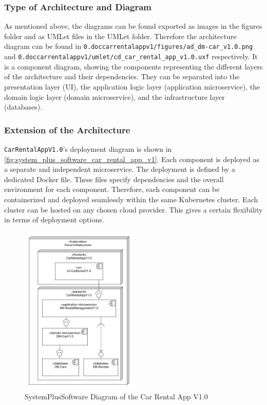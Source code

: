 \subsubsection*{Type of Architecture and Diagram}
As mentioned above, the diagrams can be found exported as images in the figures folder and as UMLet files in the UMLet folder.
Therefore the architecture diagram can be found in \texttt{0.doccarrentalappv1/figures/ad\_dm-car\_v1.0.png} and \hfill \linebreak \texttt{0.doccarrentalappv1/umlet/cd\_car\_rental\_app\_v1.0.uxf} respectively.
It is a component diagram, showing the components representing the different layers of the architecture and their dependencies.
They can be separated into the presentation layer (UI), the application logic layer (application microservice), the domain logic layer (domain microservice), and the infrastructure layer (databases).

\subsubsection*{Extension of the Architecture}
\texttt{CarRentalAppV1.0}'s deployment diagram is shown in \autoref{fig:system_plus_software_car_rental_app_v1}.
Each component is deployed as a separate and independent microservice.
The deployment is defined by a dedicated Docker file.
These files specify dependencies and the overall environment for each component.
Therefore, each component can be containerized and deployed seamlessly within the same Kubernetes cluster.
Each cluster can be hosted on any chosen cloud provider.
This gives a certain flexibility in terms of deployment options.


\begin{figure}
    \centering
    \includegraphics[width=0.5\textwidth]{figures/microservices/introduction/ms_dmCar_SPScarRental.png}
    \caption{SystemPlusSoftware Diagram of the Car Rental App V1.0}
    \label{fig:system_plus_software_car_rental_app_v1}
\end{figure}
